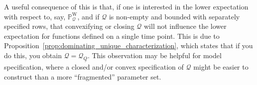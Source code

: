 \documentclass[10pt,a4paper]{paper}
\theoremstyle{definition}
\newcommand{\processes}{\mathbb{P}}
\newcommand{\wprocesses}{\processes^{\mathrm{W}}}
\newcommand{\rateset}{\mathcal{Q}}
\newcommand{\lrate}{\underline{Q}}
\begin{document}
A useful consequence of this is that, if one is interested in the lower expectation with respect to, say, $\wprocesses_{\rateset}$, and if $\rateset$ is non-empty and bounded with separately specified rows, that convexifying or closing $\rateset$ will not influence the lower expectation for functions defined on a single time point. This is due to Proposition~\ref{prop:dominating_unique_characterization}, which states that if you do this, you obtain $\rateset=\rateset_{\lrate}$. This observation may be helpful for model specification, where a closed and/or convex specification of $\rateset$ might be easier to construct than a more ``fragmented'' parameter set.

%
%
%
\end{document}
